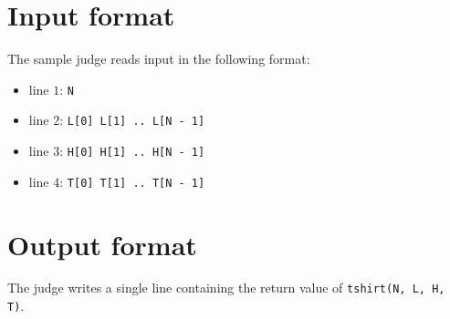 \section*{Input format}
The sample judge reads input in the following format:

\begin{itemize}
  \item line $1$: \texttt{N}
  \item line $2$: \texttt{L[0] L[1] .. L[N - 1]}
  \item line $3$: \texttt{H[0] H[1] .. H[N - 1]}
  \item line $4$: \texttt{T[0] T[1] .. T[N - 1]}
\end{itemize}

\section*{Output format}
The judge writes a single line containing the return value of \texttt{tshirt(N, L, H, T)}.
